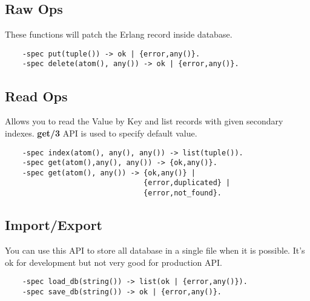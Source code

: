 \subsection{Raw Ops}
These functions will patch the Erlang record inside database.

\vspace{1\baselineskip}
\begin{lstlisting}
    -spec put(tuple()) -> ok | {error,any()}.
    -spec delete(atom(), any()) -> ok | {error,any()}.
\end{lstlisting}
\vspace{1\baselineskip}

\subsection{Read Ops}
Allows you to read the Value by Key and list records with given secondary indexes.
{\bf get/3} API is used to specify default value.

\vspace{1\baselineskip}
\begin{lstlisting}
    -spec index(atom(), any(), any()) -> list(tuple()).
    -spec get(atom(),any(), any()) -> {ok,any()}.
    -spec get(atom(), any()) -> {ok,any()} |
                                {error,duplicated} |
                                {error,not_found}.
\end{lstlisting}
\vspace{1\baselineskip}

\subsection{Import/Export}
You can use this API to store all database
in a single file when it is possible. It's ok for development but not very good for production API.

\vspace{1\baselineskip}
\begin{lstlisting}
    -spec load_db(string()) -> list(ok | {error,any()}).
    -spec save_db(string()) -> ok | {error,any()}.
\end{lstlisting}
\vspace{1\baselineskip}
